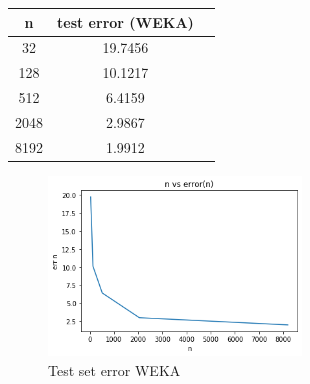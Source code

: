 \documentclass[a4paper]{article}
\theoremstyle{definition}
\newenvironment{soln}{
    \leavevmode\color{blue}\ignorespaces
}{}
\begin{document}
\begin{soln}
\begin{table}[htb]
	\centering
	\begin{tabular}{ccc}\hline
	n & test error (WEKA)   \\\hline
	32 & 19.7456  \\
	128 &  10.1217\\
	512 &  6.4159  \\
	2048 & 2.9867 \\
	8192 & 1.9912\\
	\end{tabular}
	\end{table}

	\begin{figure}[h!]
	        \centering
	        \includegraphics[width=0.6\textwidth]{errorvsnWEKA.png} 
	        \captionsetup{labelformat=empty}
	        \caption{Test set error WEKA}
	        \label{fig:Test set error WEKA}
	  \end{figure}
	

\end{soln}


\end{document}
